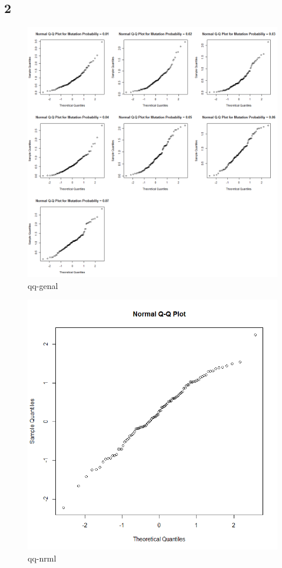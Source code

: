 \documentclass{article}
\begin{document}
    \subsection*{2}
    \begin{figure}[!htb]
      \includegraphics[scale=0.4]{../results/3_2_1.png}
      \caption{qq-genal}
      \label{fig:qq-genal}
    \end{figure}
    \begin{figure}[!htb]
    \centering
      \includegraphics[scale=0.3]{../results/3_2_2.png}
      \caption{qq-nrml}
      \label{fig:qq-nrml}
    \end{figure}
    
\end{document}
